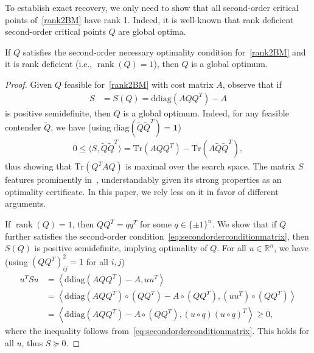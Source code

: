 \documentclass{colt2016} %
\newcommand{\inner}[2]{\left\langle{#1},{#2}\right\rangle}
\newcommand{\innersmall}[2]{\langle{#1},{#2}\rangle}
\newcommand{\trace}{\mathrm{Tr}}
\newcommand{\Rn}{{\mathbb{R}^n}}
\newcommand{\diag}{\mathrm{diag}}
\newcommand{\rank}{\operatorname{rank}}
\newcommand{\1}{\mathbf{1}}
\newcommand{\TODO}[1]{{\color{red}{[#1]}}}
\newcommand{\ddiag}{\mathrm{ddiag}}
\begin{document}
To establish exact recovery, we only need to show that all second-order critical points of~\eqref{rank2BM} have rank 1. Indeed, it is well-known that rank deficient second-order critical points $Q$ are global optima.
\begin{lemma}\label{lem:rankdeficientglobalopt}
	If $Q$ satisfies the second-order necessary optimality condition for~\eqref{rank2BM} and it is rank deficient (i.e., $\rank(Q) = 1$), then $Q$ is a global optimum.
\end{lemma}
\begin{proof}
	Given $Q$ feasible for~\eqref{rank2BM} with cost matrix $A$, observe that if
	\begin{align}
		S & = S(Q) = \ddiag(AQQ^T) - A
		\label{eq:S}
	\end{align}
	is positive semidefinite, then $Q$ is a global optimum. Indeed, for any feasible contender $\tilde Q$, we have (using $\diag(\tilde Q \tilde Q^T) = \1$)
	\begin{align*}
		0 \leq \innersmall{S}{\tilde Q \tilde Q^T} = \trace(AQQ^T) - \trace(A\tilde Q \tilde Q^T),
	\end{align*}
	thus showing that $\trace(Q^TAQ)$ is maximal over the search space. The matrix $S$ features prominently in~\citep{burer2002rank,burer2005local,journee2010low,wen2013orthogonality,bandeira2014tightness,boumal2015staircase,boumal2016nonconvexphase}, understandably given its strong properties as an optimality certificate. In this paper, we rely less on it in favor of different arguments.
	
	If $\rank(Q) = 1$, then $QQ^T = qq^T$ for some $q \in \{ \pm 1 \}^n$. We show that if $Q$ further satisfies the second-order condition~\eqref{eq:secondorderconditionmatrix}, then $S(Q)$ is positive semidefinite, implying optimality of $Q$. For all $u\in\Rn$, we have (using $(QQ^T)_{ij}^2 = 1$ for all $i,j$)
	\begin{align*}
		u^TSu & = \inner{\ddiag(AQQ^T) - A}{uu^T} \\
			  & = \inner{\ddiag(AQQ^T) \circ (QQ^T) - A \circ (QQ^T)}{(uu^T) \circ (QQ^T)} \\
			  & = \inner{\ddiag(AQQ^T) - A \circ (QQ^T)}{(u\circ q)(u\circ q)^T} \geq 0,
	\end{align*}
	where the inequality follows from~\eqref{eq:secondorderconditionmatrix}. This holds for all $u$, thus $S\succeq 0$.
\end{proof} 
\end{document}

